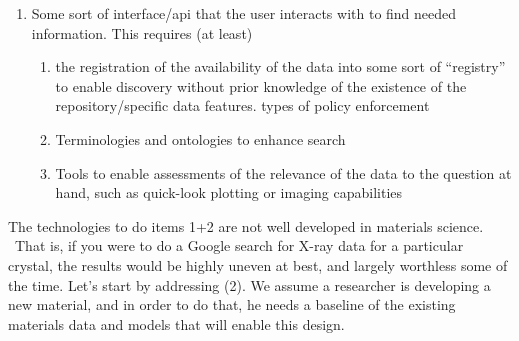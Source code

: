 \begin{enumerate}
\begin{enumerate}
\begin{enumerate}
\end{enumerate}
\end{enumerate}
\item  Some sort of interface/api that the user interacts with to find
  needed information.  This requires (at least)
\begin{enumerate}
\item	the registration of the availability of the data into some sort of “registry” to enable discovery without prior knowledge of the existence of the repository/specific data features.
\itemVarious types of policy enforcement  
\item	Terminologies and ontologies to enhance search 
\item	Tools to enable assessments of the relevance of the data to the question at hand, such as quick-look plotting or imaging capabilities
\end{enumerate}
\end{enumerate}




The technologies to do items 1+2 are not well developed in materials science.  That is, if you were to do a Google search for X-ray data for a particular crystal, the results would be highly uneven at best, and largely worthless some of the time.  Let’s start by addressing (2).  We assume a researcher is developing a new material, and in order to do that, he needs a baseline of the existing materials data and models that will enable this design.  

